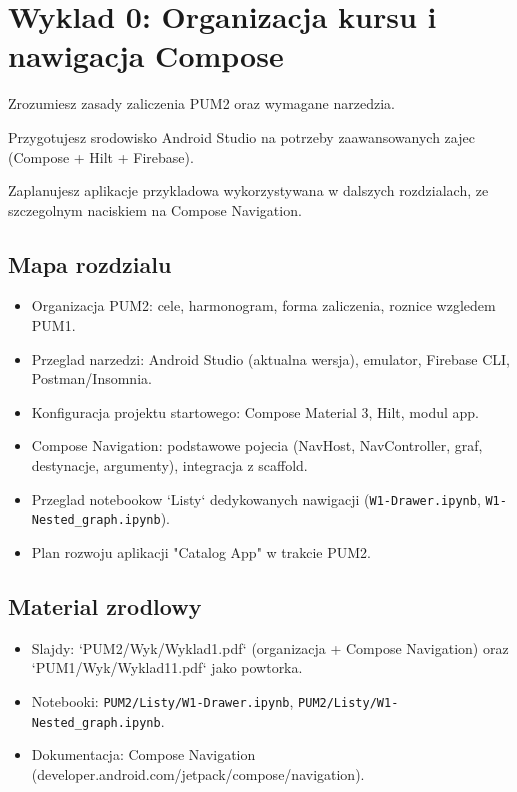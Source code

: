 \chapter{Wyklad 0: Organizacja kursu i nawigacja Compose}

\begin{learningobjectives}
  \item Zrozumiesz zasady zaliczenia PUM2 oraz wymagane narzedzia.
  \item Przygotujesz srodowisko Android Studio na potrzeby zaawansowanych zajec (Compose + Hilt + Firebase).
  \item Zaplanujesz aplikacje przykladowa wykorzystywana w dalszych rozdzialach, ze szczegolnym naciskiem na Compose Navigation.
\end{learningobjectives}

\section{Mapa rozdzialu}
\begin{itemize}
  \item Organizacja PUM2: cele, harmonogram, forma zaliczenia, roznice wzgledem PUM1.
  \item Przeglad narzedzi: Android Studio (aktualna wersja), emulator, Firebase CLI, Postman/Insomnia.
  \item Konfiguracja projektu startowego: Compose Material 3, Hilt, modul app.
  \item Compose Navigation: podstawowe pojecia (NavHost, NavController, graf, destynacje, argumenty), integracja z scaffold.
  \item Przeglad notebookow `Listy` dedykowanych nawigacji (\texttt{W1-Drawer.ipynb}, \texttt{W1-Nested\_graph.ipynb}).
  \item Plan rozwoju aplikacji "Catalog App" w trakcie PUM2.
\end{itemize}

\section{Material zrodlowy}
\begin{itemize}
  \item Slajdy: `PUM2/Wyk/Wyklad1.pdf` (organizacja + Compose Navigation) oraz `PUM1/Wyk/Wyklad11.pdf` jako powtorka.
  \item Notebooki: \texttt{PUM2/Listy/W1-Drawer.ipynb}, \texttt{PUM2/Listy/W1-Nested\_graph.ipynb}.
  \item Dokumentacja: Compose Navigation (developer.android.com/jetpack/compose/navigation).
\end{itemize}

